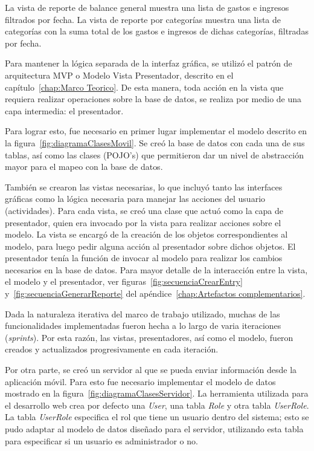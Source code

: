 La vista de reporte de balance general muestra una lista de gastos e ingresos filtrados por fecha. La vista de reporte por categorías muestra una lista de categorías con la suma total de los gastos e ingresos de dichas categorías, filtradas por fecha.

Para mantener la lógica separada de la interfaz gráfica, se utilizó el patrón de arquitectura MVP o Modelo Vista Presentador, descrito en el capítulo~\ref{chap:Marco Teorico}. De esta manera, toda acción en la vista que requiera realizar operaciones sobre la base de datos, se realiza por medio de una capa intermedia: el presentador. 

Para lograr esto, fue necesario en primer lugar implementar el modelo descrito en la figura~\ref{fig:diagramaClasesMovil}. Se creó la base de datos con cada una de sus tablas, así como las clases (POJO's) que permitieron dar un nivel de abstracción mayor para el mapeo con la base de datos.

También se crearon las vistas necesarias, lo que incluyó tanto las interfaces gráficas como la lógica necesaria para manejar las acciones del usuario (actividades). Para cada vista, se creó una clase que actuó como la capa de presentador, quien era invocado por la vista para realizar acciones sobre el modelo. La vista se encargó de la creación de los objetos correspondientes al modelo, para luego pedir alguna acción al presentador sobre dichos objetos. El presentador tenía la función de invocar al modelo para realizar los cambios necesarios en la base de datos. Para mayor detalle de la interacción entre la vista, el modelo y el presentador, ver figuras~\ref{fig:secuenciaCrearEntry} y~\ref{fig:secuenciaGenerarReporte} del apéndice~\ref{chap:Artefactos complementarios}.

Dada la naturaleza iterativa del marco de trabajo utilizado, muchas de las funcionalidades implementadas fueron hecha a lo largo de varia iteraciones (\textit{sprints}). Por esta razón, las vistas, presentadores, así como el modelo, fueron creados y actualizados progresivamente en cada iteración.

Por otra parte, se creó un servidor al que se pueda enviar información desde la aplicación móvil. 
Para esto fue necesario implementar el modelo de datos mostrado en la figura~\ref{fig:diagramaClasesServidor}. La herramienta utilizada para el desarrollo web crea por defecto una \textit{User}, una tabla \textit{Role} y otra tabla \textit{UserRole}. La tabla \textit{UserRole} especifica el rol que tiene un usuario dentro del sistema; esto se pudo adaptar al modelo de datos diseñado para el servidor, utilizando esta tabla para especificar si un usuario es administrador o no.


